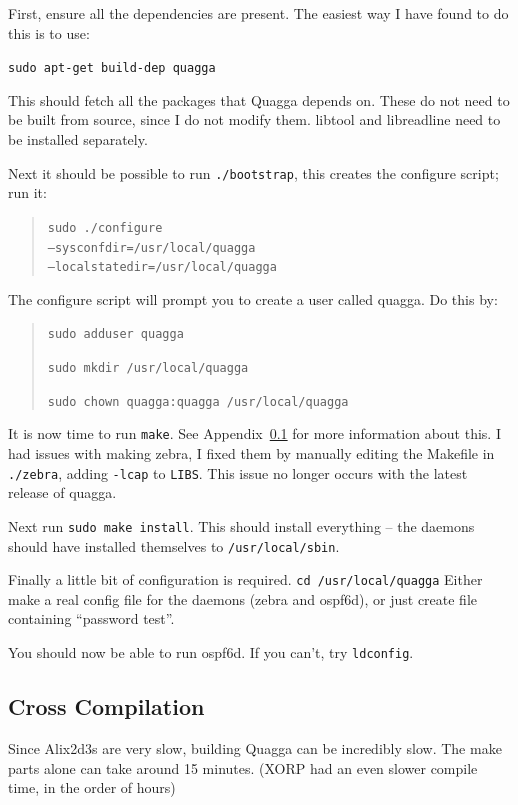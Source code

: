 First, ensure all the dependencies are present. The easiest
way I have found to do this is to use:

\texttt{sudo apt-get build-dep quagga}

This should fetch all the packages that Quagga depends on. These do not need to
be built from source, since I do not modify them. libtool and libreadline need
to be installed separately. 


Next it should be possible to run \texttt{\@./bootstrap}, this creates the
configure script; run it:

\begin{quote}
\texttt{sudo \@./configure \\ --sysconfdir=/usr/local/quagga \\ --localstatedir=/usr/local/quagga}
\end{quote}

The configure script will prompt you to create a user called quagga. Do this by:

\begin{quote}
\texttt{sudo adduser quagga}

\texttt{sudo mkdir /usr/local/quagga}

\texttt{sudo chown quagga:quagga /usr/local/quagga}
\end{quote}

It is now time to run \texttt{make}. See Appendix~\ref{cross_compile} for more
information about this. I had issues with making zebra, I fixed them by
manually editing the Makefile in \texttt{\@./zebra}, adding \texttt{-lcap} to
\texttt{LIBS}\@. This issue no longer occurs with the latest release of quagga.

Next run \texttt{sudo make install}. This should install everything -- the daemons
should have installed themselves to \texttt{/usr/local/sbin}.

Finally a little bit of configuration is required. \texttt{cd
/usr/local/quagga} Either make a real config file for the daemons (zebra and
ospf6d), or just create file containing ``password test''.

You should now be able to run ospf6d. If you can't, try \texttt{ldconfig}.

\subsection{Cross Compilation}
\label{cross_compile}
Since Alix2d3s are very slow, building Quagga can be incredibly slow. The make
parts alone can take around 15 minutes. (XORP had an even slower compile time,
in the order of hours) 


